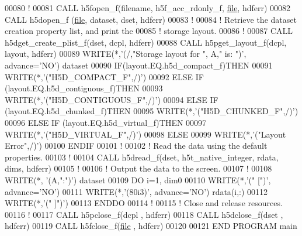 \begin{DoxyCode}
00080   \textcolor{comment}{!}
00081   \textcolor{keyword}{CALL }h5fopen\_f(filename, h5f\_acc\_rdonly\_f, \hyperlink{structfile}{file}, hdferr)
00082   \textcolor{keyword}{CALL }h5dopen\_f (\hyperlink{structfile}{file}, dataset, dset, hdferr)
00083   \textcolor{comment}{!}
00084   \textcolor{comment}{! Retrieve the dataset creation property list, and print the}
00085   \textcolor{comment}{! storage layout.}
00086   \textcolor{comment}{!}
00087   \textcolor{keyword}{CALL }h5dget\_create\_plist\_f(dset, dcpl, hdferr)
00088   \textcolor{keyword}{CALL }h5pget\_layout\_f(dcpl, layout, hdferr)
00089   \textcolor{keyword}{WRITE}(*,\textcolor{stringliteral}{'(/,"Storage layout for ", A," is: ")'}, advance=\textcolor{stringliteral}{'NO'}) dataset
00090   \textcolor{keywordflow}{IF}(layout.EQ.h5d\_compact\_f)\textcolor{keywordflow}{THEN}
00091      \textcolor{keyword}{WRITE}(*,\textcolor{stringliteral}{'("H5D\_COMPACT\_F",/)'})
00092   \textcolor{keywordflow}{ELSE} \textcolor{keywordflow}{IF} (layout.EQ.h5d\_contiguous\_f)\textcolor{keywordflow}{THEN}
00093      \textcolor{keyword}{WRITE}(*,\textcolor{stringliteral}{'("H5D\_CONTIGUOUS\_F",/)'})
00094   \textcolor{keywordflow}{ELSE} \textcolor{keywordflow}{IF} (layout.EQ.h5d\_chunked\_f)\textcolor{keywordflow}{THEN}
00095      \textcolor{keyword}{WRITE}(*,\textcolor{stringliteral}{'("H5D\_CHUNKED\_F",/)'})
00096   \textcolor{keywordflow}{ELSE} \textcolor{keywordflow}{IF} (layout.EQ.h5d\_virtual\_f)\textcolor{keywordflow}{THEN}
00097      \textcolor{keyword}{WRITE}(*,\textcolor{stringliteral}{'("H5D\_VIRTUAL\_F",/)'})
00098   \textcolor{keywordflow}{ELSE}
00099      \textcolor{keyword}{WRITE}(*,\textcolor{stringliteral}{'("Layout Error",/)'})
00100 \textcolor{keywordflow}{  ENDIF}
00101   \textcolor{comment}{!}
00102   \textcolor{comment}{! Read the data using the default properties.}
00103   \textcolor{comment}{!}
00104   \textcolor{keyword}{CALL }h5dread\_f(dset, h5t\_native\_integer, rdata, dims, hdferr)
00105   \textcolor{comment}{!}
00106   \textcolor{comment}{! Output the data to the screen.}
00107   \textcolor{comment}{!}
00108   \textcolor{keyword}{WRITE}(*, \textcolor{stringliteral}{'(A,":")'}) dataset
00109   \textcolor{keywordflow}{DO} i=1, dim0
00110      \textcolor{keyword}{WRITE}(*,\textcolor{stringliteral}{'(" [")'}, advance=\textcolor{stringliteral}{'NO'})
00111      \textcolor{keyword}{WRITE}(*,\textcolor{stringliteral}{'(80i3)'}, advance=\textcolor{stringliteral}{'NO'}) rdata(i,:)
00112      \textcolor{keyword}{WRITE}(*,\textcolor{stringliteral}{'(" ]")'})
00113 \textcolor{keywordflow}{  ENDDO}
00114   \textcolor{comment}{!}
00115   \textcolor{comment}{! Close and release resources.}
00116   \textcolor{comment}{!}
00117   \textcolor{keyword}{CALL }h5pclose\_f(dcpl , hdferr)
00118   \textcolor{keyword}{CALL }h5dclose\_f(dset , hdferr)
00119   \textcolor{keyword}{CALL }h5fclose\_f(\hyperlink{structfile}{file} , hdferr)
00120 
00121 \textcolor{keyword}{END PROGRAM }main
\end{DoxyCode}
